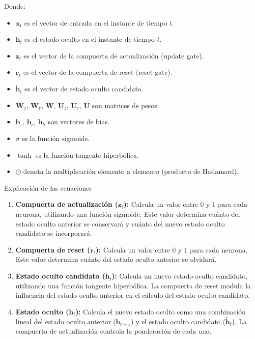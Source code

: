 \documentclass{article}
\begin{document}
Donde:

\begin{itemize}
    \item \(\mathbf{x}_t\) es el vector de entrada en el instante de tiempo \(t\).
    \item \(\mathbf{h}_t\) es el estado oculto en el instante de tiempo \(t\).
    \item \(\mathbf{z}_t\) es el vector de la compuerta de actualización (update gate).
    \item \(\mathbf{r}_t\) es el vector de la compuerta de reset (reset gate).
    \item \(\tilde{\mathbf{h}}_t\) es el vector de estado oculto candidato.
    \item \(\mathbf{W}_z\), \(\mathbf{W}_r\), \(\mathbf{W}\), \(\mathbf{U}_z\), \(\mathbf{U}_r\), \(\mathbf{U}\) son matrices de pesos.
    \item \(\mathbf{b}_z\), \(\mathbf{b}_r\), \(\mathbf{b}_h\) son vectores de bias.
    \item \(\sigma\) es la función sigmoide.
    \item \(\tanh\) es la función tangente hiperbólica.
    \item \(\odot\) denota la multiplicación elemento a elemento (producto de Hadamard).
\end{itemize}

Explicación de las ecuaciones

\begin{enumerate}
    \item \textbf{Compuerta de actualización (\(\mathbf{z}_t\)):}  Calcula un valor entre 0 y 1 para cada neurona, utilizando una función sigmoide.  Este valor determina cuánto del estado oculto anterior se conservará y cuánto del nuevo estado oculto candidato se incorporará.
    \item \textbf{Compuerta de reset (\(\mathbf{r}_t\)):}  Calcula un valor entre 0 y 1 para cada neurona.  Este valor determina cuánto del estado oculto anterior se olvidará.
    \item \textbf{Estado oculto candidato (\(\tilde{\mathbf{h}}_t\)):}  Calcula un nuevo estado oculto candidato, utilizando una función tangente hiperbólica.  La compuerta de reset modula la influencia del estado oculto anterior en el cálculo del estado oculto candidato.
    \item \textbf{Estado oculto (\(\mathbf{h}_t\)):}  Calcula el nuevo estado oculto como una combinación lineal del estado oculto anterior (\(\mathbf{h}_{t-1}\)) y el estado oculto candidato (\(\tilde{\mathbf{h}}_t\)).  La compuerta de actualización controla la ponderación de cada uno.
\end{enumerate}
\end{document}

